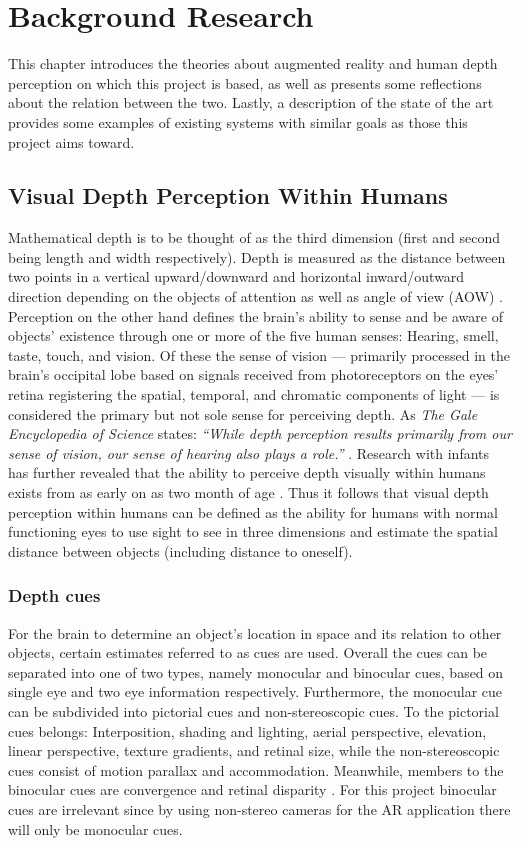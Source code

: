 \chapter{Background Research}\label{ch:backgroundresearch}
This chapter introduces the theories about augmented reality and human depth perception on which this project is based, as well as presents some reflections about the relation between the two. Lastly, a description of the state of the art provides some examples of existing systems with similar goals as those this project aims toward.

\section{Visual Depth Perception Within Humans}
Mathematical depth is to be thought of as the third dimension (first and second being length and width respectively). Depth is measured as the distance between two points in a vertical upward/downward and horizontal inward/outward direction depending on the objects of attention as well as angle of view (AOW) \cite{Gale}. Perception on the other hand defines the brain’s ability to sense and be aware of objects' existence through one or more of the five human senses: Hearing, smell, taste, touch, and vision. Of these the sense of vision --- primarily processed in the brain’s occipital lobe based on signals received from photoreceptors on the eyes’ retina registering the spatial, temporal, and chromatic components of light \cite{Spector2003} --- is considered the primary but not sole sense for perceiving depth. As \textit{The Gale Encyclopedia of Science} states: \textit{“While depth perception results primarily from our sense of vision, our sense of hearing also plays a role.”} \cite{Gale}. Research with infants has further revealed that the ability to perceive depth visually within humans exists from as early on as two month of age \cite{Gale}. Thus it follows that visual depth perception within humans can be defined as the ability for humans with normal functioning eyes to use sight to see in three dimensions and estimate the spatial distance between objects (including distance to oneself).

\subsection{Depth cues}
For the brain to determine an object’s location in space and its relation to other objects, certain estimates referred to as cues are used. Overall the cues can be separated into one of two types, namely monocular and binocular cues, based on single eye and two eye information respectively. Furthermore, the monocular cue can be subdivided into pictorial cues and non-stereoscopic cues. To the pictorial cues belongs: Interposition, shading and lighting, aerial perspective, elevation, linear perspective, texture gradients, and retinal size, while the non-stereoscopic cues consist of motion parallax and accommodation. Meanwhile, members to the binocular cues are convergence and retinal disparity \cite{Gale}. For this project binocular cues are irrelevant since by using non-stereo cameras for the AR application there will only be monocular cues. 

